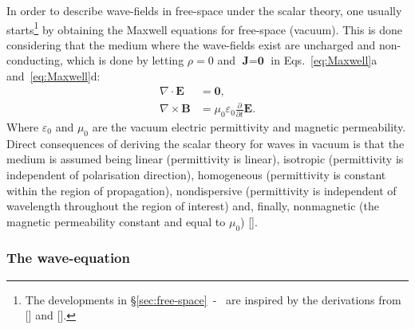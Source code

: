 \begin{refsection}
In order to describe wave-fields in free-space under the scalar theory, one usually starts\footnote{The developments in §\ref{sec:free-space}~-~\textit{} are inspired by the derivations from [\cite[\textit{§1}]{Paganin2006}] and [\cite[\textit{§3} \& \textit{§4}]{Goodman2017}].} by obtaining the Maxwell equations for free-space (vacuum). This is done considering that the medium where the wave-fields exist are uncharged and non-conducting, which is done by letting $\rho=0$ and $\textbf{J}=\textbf{0}$ in Eqs.~\ref{eq:Maxwell}a and~\ref{eq:Maxwell}d:
\begin{subequations}\label{eq:Maxwell_free}
    \begin{align}
        \nabla\cdot\textbf{E} &= \textbf{0},\\
        \nabla\times\textbf{B} &= \mu_0\varepsilon_0\frac{\partial}{\partial t}\textbf{E}.
    \end{align}
\end{subequations}{}
Where $\varepsilon_0$ and $\mu_0$ are the vacuum electric permittivity and magnetic permeability. Direct consequences of deriving the scalar theory for waves in vacuum is that the medium is assumed being linear (permittivity is linear), isotropic (permittivity is independent of polarisation direction), homogeneous (permittivity is constant within the region of propagation), nondispersive (permittivity is independent of wavelength throughout the region of interest) and, finally, nonmagnetic (the magnetic permeability constant and equal to $\mu_0$) [\cite[\textit{§3.2}]{Goodman2017}]. 

\subsubsection*{The wave-equation}


\end{refsection}
